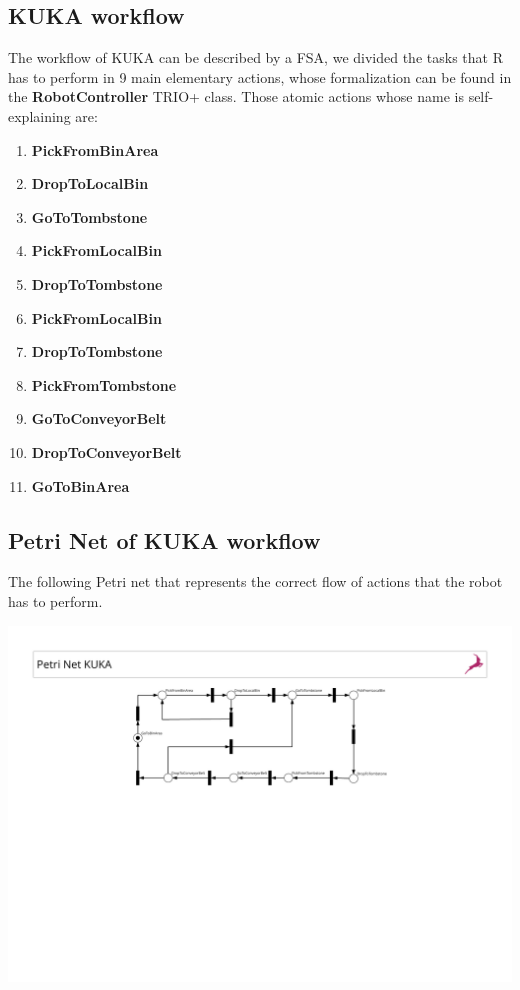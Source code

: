 \documentclass[a4paper]{article}
\begin{document}
\subsection{KUKA workflow}
The workflow of KUKA can be described by a FSA, we divided the tasks that R has to perform in 9 main elementary actions, whose formalization can be found in the \textbf{RobotController} TRIO+ class.
Those atomic actions whose name is self-explaining are:

\begin{enumerate}
    \item \textbf{PickFromBinArea}\@ 
    \item \textbf{DropToLocalBin}\@
    \item \textbf{GoToTombstone}\@ 
    \item \textbf{PickFromLocalBin}\@ 
    \item \textbf{DropToTombstone}\@ 
    \item \textbf{PickFromLocalBin}\@ 
    \item \textbf{DropToTombstone}\@ 
    \item \textbf{PickFromTombstone}\@ 
    \item \textbf{GoToConveyorBelt}\@ 
    \item \textbf{DropToConveyorBelt}\@ 
    \item \textbf{GoToBinArea}\@ 
\end{enumerate}

\subsection{Petri Net of KUKA workflow}
The following Petri net that represents the correct flow of actions that the robot has to perform.
\begin{center}
    \includegraphics[width=18cm]{images/PetriNetKuka}
\end{center}
\end{document}
